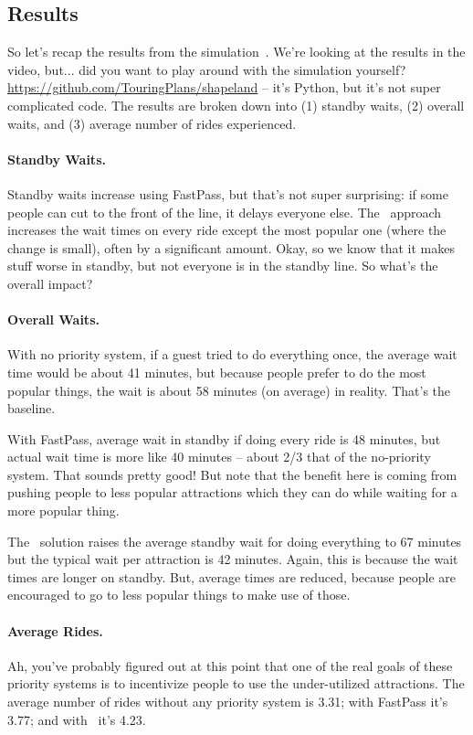 \subsection*{Results}
So let's recap the results from the simulation~\cite{dldisney}. We're looking at the results in the video, but... did you want to play around with the simulation yourself? \url{https://github.com/TouringPlans/shapeland} -- it's Python, but it's not super complicated code. The results are broken down into (1) standby waits, (2) overall waits, and (3) average number of rides experienced. 

\paragraph{Standby Waits.}
Standby waits increase using FastPass, but that's not super surprising: if some people can cut to the front of the line, it delays everyone else. The \FPP~approach increases the wait times on every ride except the most popular one (where the change is small), often by a significant amount. Okay, so we know that it makes stuff worse in standby, but not everyone is in the standby line. So what's the overall impact?

\paragraph{Overall Waits.}

With no priority system, if a guest tried to do everything once, the average wait time would be about 41 minutes, but because people prefer to do the most popular things, the wait is about 58 minutes (on average) in reality. That's the baseline.

With FastPass, average wait in standby if doing every ride is 48 minutes, but actual wait time is more like 40 minutes -- about 2/3 that of the no-priority system. That sounds pretty good! But note that the benefit here is coming from pushing people to less popular attractions which they can do while waiting for a more popular thing. 

The \FPP~solution raises the average standby wait for doing everything to 67 minutes but the typical wait per attraction is 42 minutes. Again, this is because the wait times are longer on standby. But, average times are reduced, because people are encouraged to go to less popular things to make use of those.

\paragraph{Average Rides.}
Ah, you've probably figured out at this point that one of the real goals of these priority systems is to incentivize people to use the under-utilized attractions. The average number of rides without any priority system is 3.31; with FastPass it's 3.77; and with \FPP~it's 4.23. 

